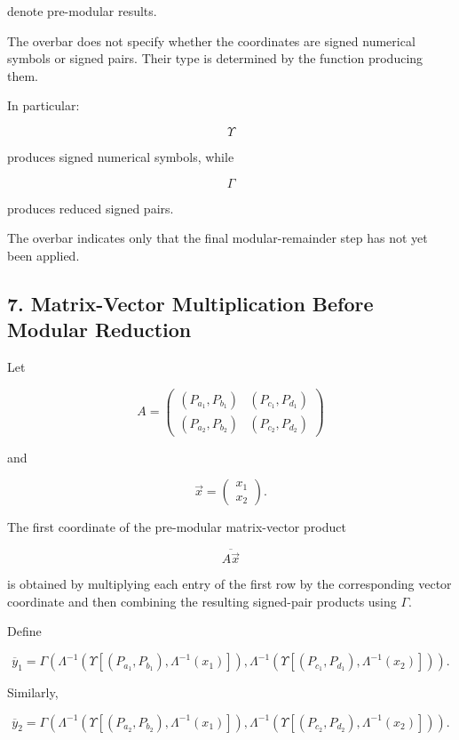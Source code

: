 \documentclass[12pt]{article}
\begin{document}
denote pre-modular results.

The overbar does not specify whether the coordinates are signed numerical symbols or signed pairs. Their type is determined by the function producing them.

In particular:

\[
\Upsilon
\]

produces signed numerical symbols, while

\[
\Gamma
\]

produces reduced signed pairs.

The overbar indicates only that the final modular-remainder step has not yet been applied.

\subsection*{7. Matrix-Vector Multiplication Before Modular Reduction}

Let

\[
A
=
\begin{pmatrix}
(P_{a_1},P_{b_1}) & (P_{c_1},P_{d_1})\\
(P_{a_2},P_{b_2}) & (P_{c_2},P_{d_2})
\end{pmatrix}
\]

and

\[
\vec{x}
=
\begin{pmatrix}
x_1\\
x_2
\end{pmatrix}.
\]

The first coordinate of the pre-modular matrix-vector product

\[
\overline{A\vec{x}}
\]

is obtained by multiplying each entry of the first row by the corresponding vector coordinate and then combining the resulting signed-pair products using \(\Gamma\).

Define

\[
\boxed{
\overline{y}_1
=
\Gamma
\left(
\Lambda^{-1}
\left(
\Upsilon
\left[
(P_{a_1},P_{b_1}),
\Lambda^{-1}(x_1)
\right]
\right),
\Lambda^{-1}
\left(
\Upsilon
\left[
(P_{c_1},P_{d_1}),
\Lambda^{-1}(x_2)
\right]
\right)
\right).
}
\]

Similarly,

\[
\boxed{
\overline{y}_2
=
\Gamma
\left(
\Lambda^{-1}
\left(
\Upsilon
\left[
(P_{a_2},P_{b_2}),
\Lambda^{-1}(x_1)
\right]
\right),
\Lambda^{-1}
\left(
\Upsilon
\left[
(P_{c_2},P_{d_2}),
\Lambda^{-1}(x_2)
\right]
\right)
\right).
}
\]
\end{document}
